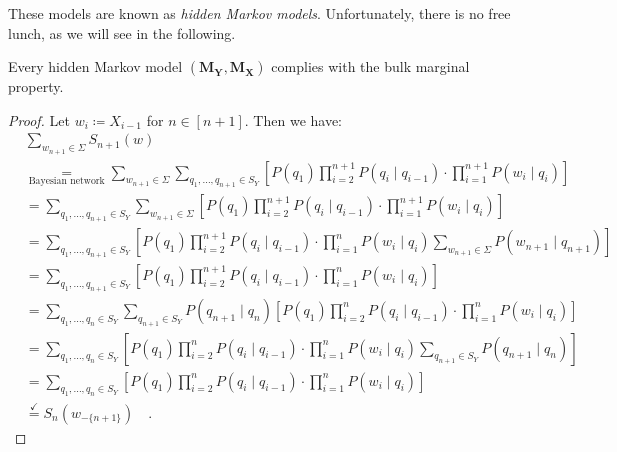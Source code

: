 \documentclass[../../main.tex]{subfiles}
\begin{document}
    These models are known as \emph{hidden Markov models}. Unfortunately, there is no free lunch, as we will see in the following.

    \begin{lemma}
        Every hidden Markov model $(\bm{M_Y}, \bm{M_X})$ complies with the bulk marginal property.
    \end{lemma}
    \begin{proof}
        Let $w_i \coloneqq X_{i - 1}$ for $n \in [n + 1]$. Then we have:
        \begin{align*}
            &\sum_{w_{n + 1} \in \Sigma} S_{n + 1}(w) \\
            &\underset{\text{Bayesian network}}{=} \sum_{w_{n + 1} \in \Sigma} \sum_{q_1, \dots, q_{n+1} \in S_Y} \left[ P(q_1) \prod_{i=2}^{n+1} P(q_i \mid q_{i-1}) \cdot \prod_{i=1}^{n+1} P(w_i \mid q_i) \right] \\
            &= \sum_{q_1, \dots, q_{n+1} \in S_Y} \sum_{w_{n + 1} \in \Sigma}  \left[ P(q_1) \prod_{i=2}^{n+1} P(q_i \mid q_{i-1}) \cdot \prod_{i=1}^{n+1} P(w_i \mid q_i) \right] \\
            &= \sum_{q_1, \dots, q_{n+1} \in S_Y} \left[ P(q_1) \prod_{i=2}^{n+1} P(q_i \mid q_{i-1}) \cdot \prod_{i=1}^{n} P(w_i \mid q_i) \sum_{w_{n + 1} \in \Sigma}  P(w_{n+1} \mid q_{n+1}) \right] \\
            &= \sum_{q_1, \dots, q_{n+1} \in S_Y} \left[ P(q_1) \prod_{i=2}^{n+1} P(q_i \mid q_{i-1}) \cdot \prod_{i=1}^{n} P(w_i \mid q_i) \right] \\
            &= \sum_{q_1, \dots, q_{n} \in S_Y} \sum_{q_{n+1} \in S_Y} P(q_{n+1} \mid q_n) \left[ P(q_1) \prod_{i=2}^{n} P(q_i \mid q_{i-1}) \cdot \prod_{i=1}^{n} P(w_i \mid q_i) \right] \\
            &= \sum_{q_1, \dots, q_{n} \in S_Y} \left[ P(q_1) \prod_{i=2}^{n} P(q_i \mid q_{i-1}) \cdot \prod_{i=1}^{n} P(w_i \mid q_i) \sum_{q_{n+1} \in S_Y} P(q_{n+1} \mid q_n) \right] \\
            &= \sum_{q_1, \dots, q_{n} \in S_Y} \left[ P(q_1) \prod_{i=2}^{n} P(q_i \mid q_{i-1}) \cdot \prod_{i=1}^{n} P(w_i \mid q_i) \right] \\
            &\overset{\checkmark}{=} S_n(w_{-\{n+1\}}) \quad .
        \end{align*}
    \end{proof}
\end{document}
